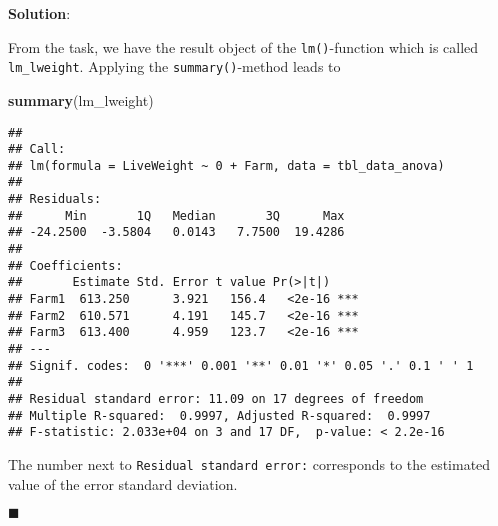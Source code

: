 \documentclass[
]{article}
\newenvironment{Shaded}{\begin{snugshade}}{\end{snugshade}}
\newcommand{\KeywordTok}[1]{\textcolor[rgb]{0.13,0.29,0.53}{\textbf{#1}}}
\newcommand{\NormalTok}[1]{#1}
\newcommand{\solstart}
{\vspace{3ex}\textbf{Solution}:}
\newcommand{\solend}
{\vspace{2ex}$\blacksquare$}
\begin{document}
\solstart

From the task, we have the result object of the \texttt{lm()}-function
which is called \texttt{lm\_lweight}. Applying the
\texttt{summary()}-method leads to

\begin{Shaded}
\begin{Highlighting}[]
\KeywordTok{summary}\NormalTok{(lm_lweight)}
\end{Highlighting}
\end{Shaded}

\begin{verbatim}
## 
## Call:
## lm(formula = LiveWeight ~ 0 + Farm, data = tbl_data_anova)
## 
## Residuals:
##      Min       1Q   Median       3Q      Max 
## -24.2500  -3.5804   0.0143   7.7500  19.4286 
## 
## Coefficients:
##       Estimate Std. Error t value Pr(>|t|)    
## Farm1  613.250      3.921   156.4   <2e-16 ***
## Farm2  610.571      4.191   145.7   <2e-16 ***
## Farm3  613.400      4.959   123.7   <2e-16 ***
## ---
## Signif. codes:  0 '***' 0.001 '**' 0.01 '*' 0.05 '.' 0.1 ' ' 1
## 
## Residual standard error: 11.09 on 17 degrees of freedom
## Multiple R-squared:  0.9997, Adjusted R-squared:  0.9997 
## F-statistic: 2.033e+04 on 3 and 17 DF,  p-value: < 2.2e-16
\end{verbatim}

The number next to \texttt{Residual\ standard\ error:} corresponds to
the estimated value of the error standard deviation.

\solend
\end{document}
